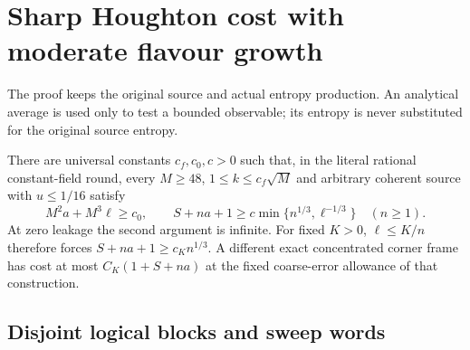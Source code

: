 \section{Sharp Houghton cost with moderate flavour growth}
\label{app:houghton-moderate}

The proof keeps the original source and actual entropy production.
An analytical average is used only to test a bounded observable;
its entropy is never substituted for the original source entropy.

\begin{theorem}
\label{thm:houghton-moderate}
There are universal constants $c_f,c_0,c>0$ such that, in the literal
rational constant-field round, every $M\geq48$,
$1\leq k\leq c_f\sqrt M$ and arbitrary coherent source with
$u\leq1/16$ satisfy
\[
 M^2a+M^3\ell\geq c_0,\qquad
 S+na+1\geq c\min\{n^{1/3},\ell^{-1/3}\}\quad(n\geq1).
\]
At zero leakage the second argument is infinite. For fixed $K>0$,
$\ell\leq K/n$ therefore forces $S+na+1\geq c_Kn^{1/3}$.
A different exact concentrated corner frame has cost at most
$C_K(1+S+na)$ at the fixed coarse-error allowance of that construction.
\end{theorem}

\subsection{Disjoint logical blocks and sweep words}

